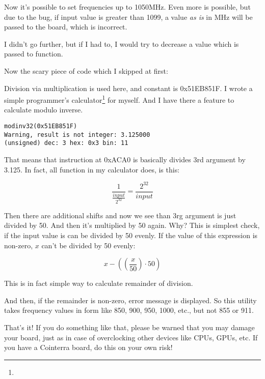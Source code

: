 Now it's possible to set frequencies up to 1050MHz. Even more is possible, but due to the bug, if input value is greater than 1099, a value \emph{as is} in MHz will be passed to the board, which is incorrect.

I didn't go further, but if I had to, I would try to decrease a value which is passed to  function.

Now the scary piece of code which I skipped at first:



Division via multiplication is used here, and constant is 0x51EB851F.
I wrote a simple programmer's calculator\footnote{\ProgCalcURL} for myself.
And I have there a feature to calculate modulo inverse.

\begin{lstlisting}
modinv32(0x51EB851F)
Warning, result is not integer: 3.125000
(unsigned) dec: 3 hex: 0x3 bin: 11
\end{lstlisting}

That means that  instruction at 0xACA0 is basically divides 3rd argument by 3.125.
In fact, all  function in my calculator does, is this:

\[
\frac{1}{\frac{input}{2^{32}}} = \frac{2^{32}}{input}
\]

Then there are additional shifts and now we see than 3rg argument is just divided by 50.
And then it's multiplied by 50 again.
Why?
This is simplest check, if the input value is can be divided by 50 evenly.
If the value of this expression is non-zero, $x$ can't be divided by 50 evenly:

\[
x-((\frac{x}{50}) \cdot 50)
\]

This is in fact simple way to calculate remainder of division.

And then, if the remainder is non-zero, error message is displayed.
So this utility takes frequency values in form like 850, 900, 950, 1000, etc., but not 855 or 911.

That's it! If you do something like that, please be warned that you may damage your board, just as in case of overclocking other devices like \ac{CPU}s, \ac{GPU}s, etc.
If you have a Cointerra board, do this on your own risk!

